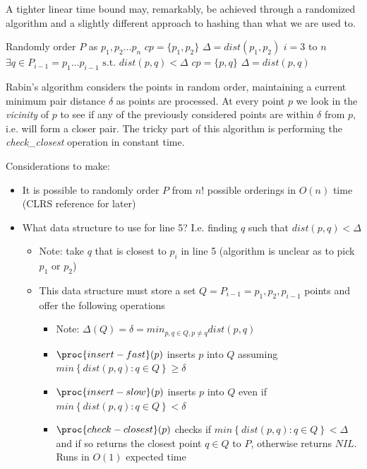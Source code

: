 \documentclass[../notes.tex]{subfiles}
\begin{document}
A tighter linear time bound may, remarkably, be achieved through a randomized algorithm and a slightly different approach to hashing than what we are used to.


\begin{codebox}
\li Randomly order $ P $ as $ p_1, p_2 \ldots p_n $
\li $ cp = \{p_1, p_2\} $
\li $\Delta = dist(p_1, p_2)$
\li \For $ i = 3 $ to $ n $ \Do
\li     \If $ \exists q \in P_{i-1} = {p_1 \ldots p_{i-1}} \text{ s.t. }dist(p, q) < \Delta $ \Then
\li     $ cp = \{p, q\} $
\li     $ \Delta = dist(p, q) $ \End \End
\end{codebox}

Rabin's algorithm considers the points in random order, maintaining a current minimum pair distance $ \delta $ as points are processed. At every point $ p $ we look in the \textit{vicinity} of $ p $ to see if any of the previously considered points are within $ \delta $ from $ p $, i.e. will form a closer pair.
The tricky part of this algorithm is performing the \textit{check\_closest} operation in constant time.

Considerations to make:

\begin{itemize}
    \item It is possible to randomly order $ P $ from $ n! $ possible orderings in $ O(n) $ time (CLRS reference for later)
    \item What data structure to use for line 5? I.e. finding $ q $ such that $ dist(p, q) < \Delta $
        \begin{itemize}
            \item Note: take $ q $ that is closest to $ p_i $ in line 5 (algorithm is unclear as to pick $ p_1 $ or $ p_2 $)
            \item This data structure must store a set $ Q = P_{i-1} = {p_1, p_2, p_{i-1}} $ points and offer the following operations
            \begin{itemize}
                \item Note: $ \Delta(Q) = \delta = min_{p, q \in Q, p \neq  q} dist(p,q)  $
                \item $ \proc{insert-fast}(p) $ inserts $ p $ into $ Q $ assuming $ min \left\{  dist(p,q) : q \in Q \right\} \ge  \delta $
                \item $ \proc{insert-slow}(p) $ inserts $ p $ into $ Q $ even if $ min \left\{  dist(p,q) : q \in Q \right\} <  \delta $
            \item $ \proc{check-closest}(p) $ checks if $ min \left\{  dist(p,q) : q \in Q \right\} < \Delta $ and if so returns the closest point $ q  \in Q$ to $ P $, otherwise returns $ NIL $. Runs in $ O(1)  $ expected time
            \end{itemize}
        \end{itemize}
\end{itemize}
\end{document}
